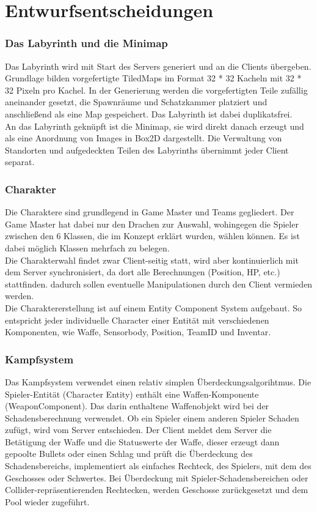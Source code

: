 \documentclass[10pt,a4paper,notitlepage]{scrreprt}
\begin{document}
	\section{Entwurfsentscheidungen}

		\subsubsection{Das Labyrinth und die Minimap}
		
		Das Labyrinth wird mit Start des Servers generiert und an die Clients übergeben. Grundlage bilden vorgefertigte TiledMaps im Format 32 * 32 Kacheln mit 32 * 32 Pixeln pro Kachel. In der Generierung werden die vorgefertigten Teile zufällig aneinander gesetzt, die Spawnräume und Schatzkammer platziert und anschließend als eine Map gespeichert. Das Labyrinth ist dabei duplikatsfrei.\\
		An das Labyrinth geknüpft ist die Minimap, sie wird direkt danach erzeugt und als eine Anordnung von Images in Box2D dargestellt. Die Verwaltung von Standorten und aufgedeckten Teilen des Labyrinths übernimmt jeder Client separat.\\
		
		\subsubsection{Charakter}
		
		Die Charaktere sind grundlegend in Game Master und Teams gegliedert. Der Game Master hat dabei nur den Drachen zur Auswahl, wohingegen die Spieler zwischen den 6 Klassen, die im Konzept erklärt wurden, wählen können. Es ist dabei möglich Klassen mehrfach zu belegen.\\
		Die Charakterwahl findet zwar Client-seitig statt, wird aber kontinuierlich mit dem Server synchronisiert, da dort alle Berechnungen (Position, HP, etc.) stattfinden. dadurch sollen eventuelle Manipulationen durch den Client vermieden werden.\\
		Die Charaktererstellung ist auf einem Entity Component System aufgebaut. So entspricht jeder individuelle Character einer Entität mit verschiedenen Komponenten, wie Waffe, Sensorbody, Position, TeamID und Inventar.\\
		
		\subsubsection{Kampfsystem} 
		Das Kampfsystem verwendet einen relativ simplen Überdeckungsalgorihtmus. Die Spieler-Entität (Character Entity) enthält eine Waffen-Komponente (WeaponComponent). Das darin enthaltene Waffenobjekt wird bei der Schadensberechnung verwendet. Ob ein Spieler einem anderen Spieler Schaden zufügt, wird vom Server entschieden. Der Client meldet dem Server die Betätigung der Waffe und die Statuswerte der Waffe, dieser erzeugt dann gepoolte Bullets oder einen Schlag und prüft die Überdeckung des Schadensbereichs, implementiert als einfaches Rechteck, des Spielers, mit dem des Geschosses oder Schwertes. Bei Überdeckung mit Spieler-Schadensbereichen oder Collider-repräsentierenden Rechtecken, werden Geschosse zurückgesetzt und dem Pool wieder zugeführt.
		
\end{document}
